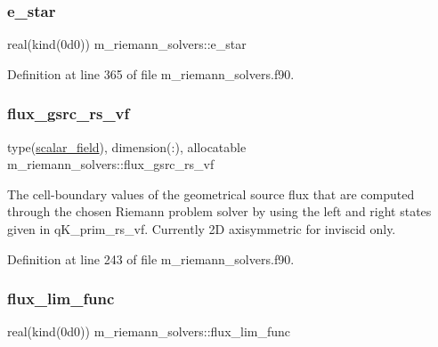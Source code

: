 \subsubsection{\texorpdfstring{e\+\_\+star}{e\_star}}
{\footnotesize\ttfamily real(kind(0d0)) m\+\_\+riemann\+\_\+solvers\+::e\+\_\+star}



Definition at line 365 of file m\+\_\+riemann\+\_\+solvers.\+f90.

\mbox{\label{namespacem__riemann__solvers_aa67462b01acb62fbe8730a28aa37b7a9}} 
\subsubsection{\texorpdfstring{flux\+\_\+gsrc\+\_\+rs\+\_\+vf}{flux\_gsrc\_rs\_vf}}
{\footnotesize\ttfamily type(\hyperlink{structm__derived__types_1_1scalar__field}{scalar\+\_\+field}), dimension(\+:), allocatable m\+\_\+riemann\+\_\+solvers\+::flux\+\_\+gsrc\+\_\+rs\+\_\+vf}



The cell-\/boundary values of the geometrical source flux that are computed through the chosen Riemann problem solver by using the left and right states given in q\+K\+\_\+prim\+\_\+rs\+\_\+vf. Currently 2D axisymmetric for inviscid only. 



Definition at line 243 of file m\+\_\+riemann\+\_\+solvers.\+f90.

\mbox{\label{namespacem__riemann__solvers_a7af64bd01982bc9c8e40b9a662d106c5}} 
\subsubsection{\texorpdfstring{flux\+\_\+lim\+\_\+func}{flux\_lim\_func}}
{\footnotesize\ttfamily real(kind(0d0)) m\+\_\+riemann\+\_\+solvers\+::flux\+\_\+lim\+\_\+func}



